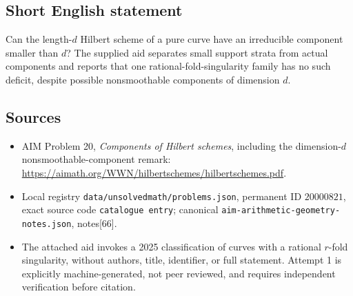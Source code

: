\documentclass[11pt]{article}
\begin{document}
\subsection{Short English statement}
Can the length-\(d\) Hilbert scheme of a pure curve have an irreducible component smaller than \(d\)? The supplied aid separates small support strata from actual components and reports that one rational-fold-singularity family has no such deficit, despite possible nonsmoothable components of dimension \(d\).
\subsection{Sources}
\begin{itemize}
\item AIM Problem 20, \emph{Components of Hilbert schemes}, including the dimension-\(d\) nonsmoothable-component remark: \url{https://aimath.org/WWN/hilbertschemes/hilbertschemes.pdf}.
\item Local registry \texttt{data/unsolvedmath/problems.json}, permanent ID \(20000821\), exact source code \texttt{catalogue entry}; canonical \texttt{aim-arithmetic-geometry-notes.json}, notes[66].
\item The attached aid invokes a 2025 classification of curves with a rational \(r\)-fold singularity, without authors, title, identifier, or full statement. Attempt 1 is explicitly machine-generated, not peer reviewed, and requires independent verification before citation.
\end{itemize}
\end{document}
